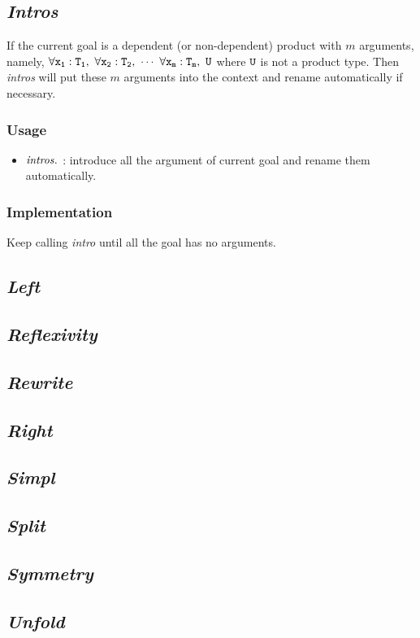 \subsection{\it Intros}

If the current goal is a dependent (or non-dependent) product with $m$ arguments, namely,
$\tt \forall x_1:T_1,\ \forall x_2:T_2,\ \cdots\ \forall x_m:T_m,\ U$ where $\tt U$ is not a product type.
Then \textit{intros} will put these $m$ arguments into the context and rename automatically if necessary.

\subsubsection*{Usage}
\begin{itemize}
\item ${\it intros}.$ : introduce all the argument of current goal and rename them automatically.
\end{itemize}

\subsubsection*{Implementation}
Keep calling {\it intro} until all the goal has no arguments.

\subsection{\it Left}

\subsection{\it Reflexivity}

\subsection{\it Rewrite}

\subsection{\it Right}

\subsection{\it Simpl}

\subsection{\it Split}

\subsection{\it Symmetry}

\subsection{\it Unfold}

